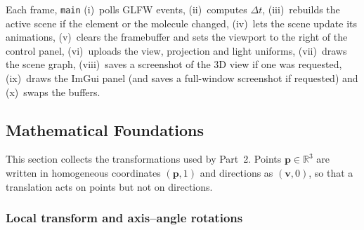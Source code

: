 \documentclass[a4paper, 11pt]{article}
\newcommand{\code}[1]{\texttt{#1}}
\begin{document}
Each frame, \code{main} (i)~polls GLFW events, (ii)~computes $\Delta t$, (iii)~rebuilds the active scene if the element or the molecule
changed, (iv)~lets the scene update its animations, (v)~clears the framebuffer and sets the viewport to the right of the control panel,
(vi)~uploads the view, projection and light uniforms, (vii)~draws the scene graph, (viii)~saves a screenshot of the 3D view if one was
requested, (ix)~draws the ImGui panel (and saves a full-window screenshot if requested) and (x)~swaps the buffers.

\subsection{Mathematical Foundations}\label{sec:math2}

This section collects the transformations used by Part~2. Points $\mathbf p\in\mathbb R^3$ are written in homogeneous coordinates
$(\mathbf p,1)$ and directions as $(\mathbf v,0)$, so that a translation acts on points but not on directions.

\subsubsection{Local transform and axis--angle rotations}
\end{document}
